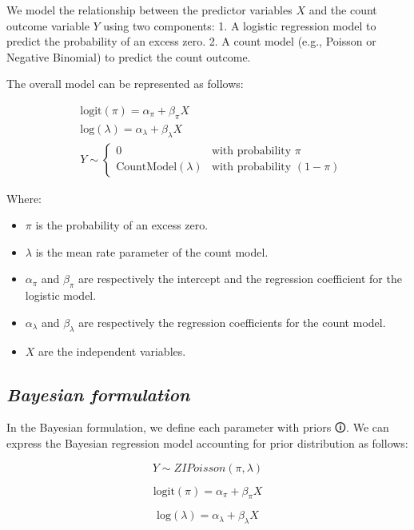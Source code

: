 \documentclass[
  letterpaper,
  DIV=11,
  numbers=noendperiod]{scrreprt}
\begin{document}
We model the relationship between the predictor variables \(X\) and the
count outcome variable \(Y\) using two components: 1. A logistic
regression model to predict the probability of an excess zero. 2. A
count model (e.g., Poisson or Negative Binomial) to predict the count
outcome.

The overall model can be represented as follows:

\[
\begin{aligned}
& \text{logit}(\pi) = \alpha_\pi + \beta_\pi X \\
& \text{log}(\lambda) = \alpha_\lambda + \beta_\lambda X\\
& Y \sim \begin{cases} 
0 & \text{with probability } \pi \\
\text{CountModel}(\lambda) & \text{with probability } (1 - \pi) 
\end{cases}
\end{aligned}
\]

Where:

\begin{itemize}
\item
  \(\pi\) is the probability of an excess zero.
\item
  \(\lambda\) is the mean rate parameter of the count model.
\item
  \(\alpha_\pi\) and \(\beta_\pi\) are respectively the intercept and
  the regression coefficient for the logistic model.
\item
  \(\alpha_\lambda\) and \(\beta_\lambda\) are respectively the
  regression coefficients for the count model.
\item
  \(X\) are the independent variables.
\end{itemize}

\subsection{\texorpdfstring{\emph{Bayesian
formulation}}{Bayesian formulation}}\label{bayesian-formulation-6}

In the Bayesian formulation, we define each parameter with
\label{prior}{{priors 🛈}}. We can express the Bayesian
regression model accounting for prior distribution as follows:

\[
𝑌\sim ZIPoisson(\pi,\lambda)
\]

\[
\text{logit}(\pi) = \alpha_\pi + \beta_\pi X
\]

\[
\text{log}(\lambda) = \alpha_\lambda + \beta_\lambda X
\]
\end{document}
